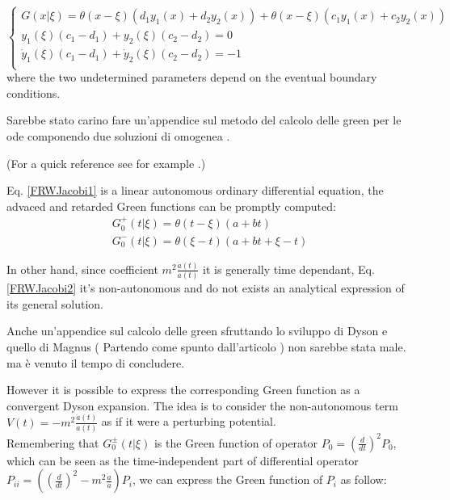 \documentclass[Main]{subfiles}
\begin{document}
			\begin{equation}
			\begin{cases}
                        G( x \vert \xi) = \theta( x - \xi) \left(d_1 y_1(x) + d_2 y_2(x) \right) + \theta( x - \xi) \left(c_1 y_1(x) + c_2 y_2(x) \right) \\
						y_1(\xi) (c_1-d_1) + y_2(\xi) ( c_2 - d_2) = 0 \\
						\dot{y}_1(\xi) (c_1-d_1) + \dot{y}_2(\xi) ( c_2 - d_2) = -1 \\
            \end{cases}
			\end{equation}
			where the two undetermined parameters depend on the eventual boundary conditions.
\ifToninus
	\begin{Warning}
		Sarebbe stato carino fare un'appendice sul metodo del calcolo delle green per le ode componendo due soluzioni di omogenea \cite{Tornberg}.
	\end{Warning}
\fi		
			(For a quick reference see for example \cite{Tornberg}.)
			
			 Eq. \ref{FRWJacobi1} is a linear autonomous ordinary differential equation, the advaced and retarded Green functions can be promptly computed:
			\begin{eqnarray}\label{SimpleGreenFunction}
				G^+_0(t \vert \xi) = \theta(t-\xi) \left(a +b t \right) \nonumber\\
				G^-_0( t \vert \xi) = \theta(\xi -t) \left( a +b t + \xi -t\right) 
			\end{eqnarray}

			In other hand, since coefficient $m^2 \frac{\ddot{a}(t)}{a(t)}$ it is generally time dependant,  Eq. \ref{FRWJacobi2} it's non-autonomous and do not exists an analytical expression of its general solution.
\ifToninus
	\begin{Warning}	
		Anche un'appendice sul calcolo delle green sfruttando lo sviluppo di Dyson e quello di Magnus ( Partendo come spunto dall'articolo \cite{Dappiaggi2014}) non sarebbe stata male. ma è venuto il tempo di concludere.
	\end{Warning}
\fi	
			However it is possible to express the corresponding Green function as a convergent Dyson expansion\cite{Dappiaggi2014}.
			The idea is to consider the non-autonomous term $V(t) = -m^2 \frac{\ddot{a}(t)}{a(t)}$ as if it were a perturbing potential.\\
			Remembering that $G^\pm_0 (t \vert \xi)$ is the Green function of operator \ifToninus$P_{0}=\left(\frac{d}{dt}\right)^2$\else$P_0$\fi, which can be seen as the time-independent part of differential operator \ifToninus$P_{i i}=\left( \left(\frac{d}{dt}\right)^2 - m^2 \frac{\ddot{a}}{a} \right)$\else$P_i$\fi, we can express the Green function of $P_{i}$ as follow:
			
\end{document}
